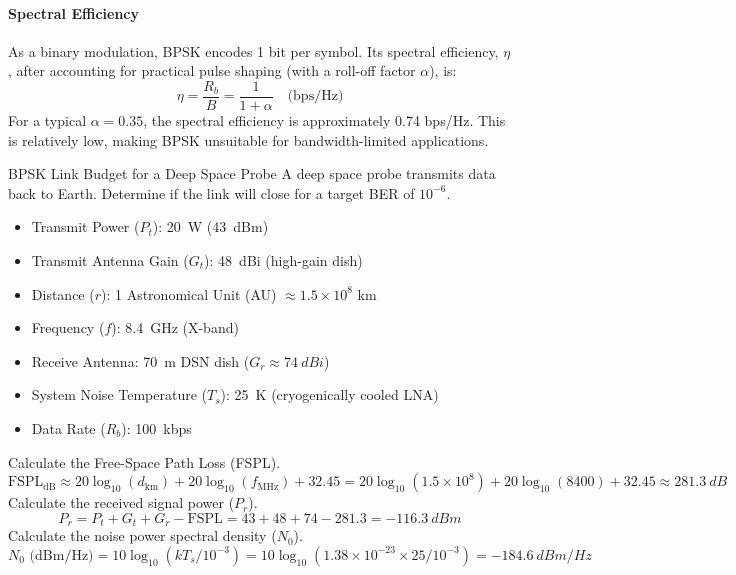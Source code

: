 \paragraph{Spectral Efficiency}
As a binary modulation, BPSK encodes 1 bit per symbol. Its spectral efficiency, $\eta$, after accounting for practical pulse shaping (with a roll-off factor $\alpha$), is:
\begin{equation}
    \eta = \frac{R_b}{B} = \frac{1}{1+\alpha} \quad \text{(bps/Hz)}
\end{equation}
For a typical $\alpha=0.35$, the spectral efficiency is approximately 0.74 bps/Hz. This is relatively low, making BPSK unsuitable for bandwidth-limited applications.


\begin{workedexample}{BPSK Link Budget for a Deep Space Probe}
     A deep space probe transmits data back to Earth. Determine if the link will close for a target BER of $10^{-6}$.
    \begin{itemize}
        \item Transmit Power ($P_t$): \qty{20}{W} (\qty{43}{dBm})
        \item Transmit Antenna Gain ($G_t$): \qty{48}{dBi} (high-gain dish)
        \item Distance ($r$): 1 Astronomical Unit (AU) $\approx 1.5 \times 10^8$ km
        \item Frequency ($f$): \qty{8.4}{GHz} (X-band)
        \item Receive Antenna: \qty{70}{m} DSN dish ($G_r \approx \qty{74}{dBi}$)
        \item System Noise Temperature ($T_s$): \qty{25}{K} (cryogenically cooled LNA)
        \item Data Rate ($R_b$): \qty{100}{kbps}
    \end{itemize}
    \begin{derivationsteps}
        \step Calculate the Free-Space Path Loss (FSPL).
        \[ \text{FSPL}_{\text{dB}} \approx 20\log_{10}(d_{\text{km}}) + 20\log_{10}(f_{\text{MHz}}) + 32.45 = 20\log_{10}(1.5 \times 10^8) + 20\log_{10}(8400) + 32.45 \approx \qty{281.3}{dB} \]
        \step Calculate the received signal power ($P_r$).
        \[ P_r = P_t + G_t + G_r - \text{FSPL} = 43 + 48 + 74 - 281.3 = \qty{-116.3}{dBm} \]
        \step Calculate the noise power spectral density ($N_0$).
        \[ N_0 \text{ (dBm/Hz)} = 10\log_{10}(k T_s / 10^{-3}) = 10\log_{10}(1.38 \times 10^{-23} \times 25 / 10^{-3}) = \qty{-184.6}{dBm/Hz} \]

\end{derivationsteps}
\end{workedexample}
